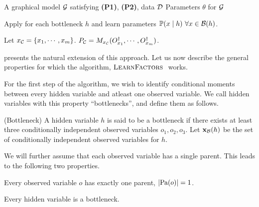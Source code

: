 \renewcommand{\algorithmicrequire}{\textbf{Input:}}
\renewcommand{\algorithmicensure}{\textbf{Output:}}
\begin{algorithm}
  \caption{\LearnFactors}
  \label{algo:directed}
  \begin{algorithmic}
    \REQUIRE A graphical model $\mathcal{G}$ satisfying \textbf{(P1)}, \textbf{(P2)}, data $\mathcal{D}$
    \ENSURE Parameters $\theta$ for $\mathcal{G}$

        \STATE Apply \TensorFactorize for each bottleneck $h$ and learn parameters $\mathbb{P}(x \mid h) ~ \forall x \in \mathcal{B}(h)$.

      \ENDFOR
      \STATE Let $x_{\mathcal{C}} = \{x_1, \cdots, x_m\}$.
      \STATE $P_{\mathcal{C}} = M_{x_{\mathcal{C}}}( {O}^{\dagger}_{x_1}, \cdots, {O}^{\dagger}_{x_m} )$.
      \ENDFOR
  \end{algorithmic}
\end{algorithm}

 presents the natural extension of this approach.
Let us now describe the general properties for which the algorithm,
  $\textsc{LearnFactors}~$ works.

For the first step of the algorithm, we wish to identify conditional
  moments between every hidden variable and atleast one observed
  variable.
We call hidden variables with this property ``bottlenecks'',
  and define them as follows.
\begin{definition}(Bottleneck)
  A hidden variable $h$ is said to be a bottleneck if there exists at
    least three conditionally independent observed variables $o_1, o_2,
    o_3$. 
  Let $\mathbf{x}_{\mathcal{B}}(h)$ be the set of conditionally independent observed
    variables for $h$.
\end{definition}

We will further assume that each observed variable has a single parent. 
This leads to the following two properties.
\begin{property}
  \label{prop:unique-parent}
  Every observed variable $o$ has exactly one parent, $|\textrm{Pa}(o)| = 1$.
\end{property}
\begin{property}
  \label{prop:bottleneck}
  Every hidden variable is a bottleneck.
\end{property}

